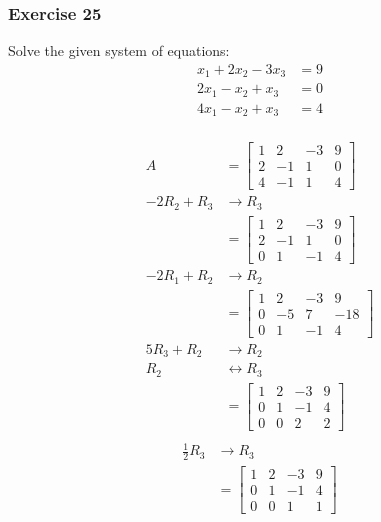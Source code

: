 \documentclass{math}
\begin{document}
\subsubsection*{Exercise 25}
Solve the given system of equations:
\begin{align*}
  x_1+2x_2-3x_3 &= 9 \\
  2x_1-x_2+x_3 &= 0 \\
  4x_1-x_2+x_3 &= 4 \\
\end{align*}
\newpage
\begin{multicols}{2}
  \begin{align*}
    A &= \begin{bmatrix}
      1 & 2 & -3 & 9 \\
      2 & -1 & 1 & 0 \\
      4 & -1 & 1 & 4
    \end{bmatrix} \\
    -2R_2+R_3 &\to R_3 \\
    &= \begin{bmatrix}
      1 & 2 & -3 & 9 \\
      2 & -1 & 1 & 0 \\
      0 & 1 & -1 & 4
    \end{bmatrix} \\
    -2R_1+R_2 &\to R_2 \\
    &= \begin{bmatrix}
      1 & 2 & -3 & 9 \\
      0 & -5 & 7 & -18 \\
      0 & 1 & -1 & 4
    \end{bmatrix} \\
    5R_3+R_2 &\to R_2 \\
    R_2 &\leftrightarrow R_3 \\
    &= \begin{bmatrix}
      1 & 2 & -3 & 9 \\
      0 & 1 & -1 & 4 \\
      0 & 0 & 2 & 2
    \end{bmatrix} \\
  \end{align*}
  \begin{align*}
    \frac{1}{2}R_3 &\to R_3 \\
    &= \begin{bmatrix}
      1 & 2 & -3 & 9 \\
      0 & 1 & -1 & 4 \\
      0 & 0 & 1 & 1
    \end{bmatrix} \\

\end{align*}
\end{multicols}
\end{document}
